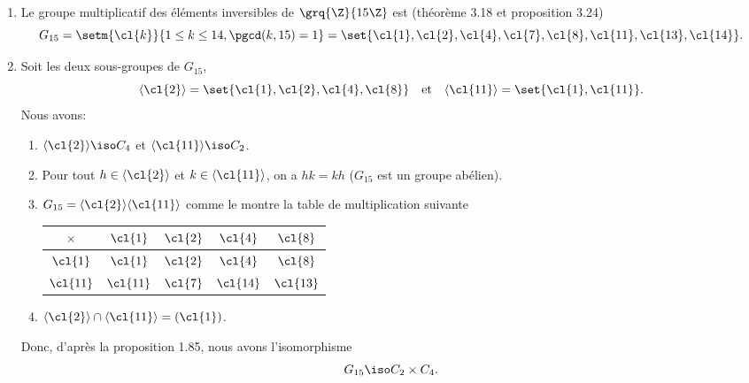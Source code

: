 \begin{enumerate}
  \item
    Le groupe multiplicatif des éléments inversibles de $\grq{\Z}{15\Z}$ est
    (théorème 3.18 et proposition 3.24)
    \[
      G_{15} 
        = \setm{\cl{k}}{1\leq k\leq 14, \pgcd(k,15)=1}
        = \set{
            \cl{1},\cl{2},\cl{4},\cl{7},\cl{8},\cl{11},\cl{13},\cl{14}
          }.
    \]
  \item
    Soit les deux sous-groupes de $G_{15}$,
    \[
      \langle\cl{2}\rangle = \set{\cl{1},\cl{2},\cl{4},\cl{8}}
      \quad\text{et}\quad
      \langle\cl{11}\rangle = \set{\cl{1},\cl{11}}.
    \]
    Nous avons:

    \begin{enumerate}[1)]
      \item
        $\langle\cl{2}\rangle \iso C_4$ et $\langle\cl{11}\rangle \iso C_2$.
      \item
        Pour tout $h\in\langle\cl{2}\rangle$ et $k\in\langle\cl{11}\rangle$, on
        a $hk = kh$ ($G_{15}$ est un groupe abélien).
      \item
        $G_{15} = \langle\cl{2}\rangle \langle\cl{11}\rangle$ comme le montre la
        table de multiplication suivante
        
        \begin{center}
          \begin{tabular}{c|cccc}
            $\times$  & $\cl{1}$  & $\cl{2}$ & $\cl{4}$  & $\cl{8}$ \\
            \midrule
            $\cl{1}$  & $\cl{1}$  & $\cl{2}$ & $\cl{4}$  & $\cl{8}$ \\
            $\cl{11}$ & $\cl{11}$ & $\cl{7}$ & $\cl{14}$ & $\cl{13}$
          \end{tabular}
        \end{center}

      \item
        $\langle\cl{2}\rangle \cap \langle\cl{11}\rangle = (\cl{1})$.
    \end{enumerate}
    
    Donc, d'après la proposition 1.85, nous avons l'isomorphisme
    \[
      G_{15} \iso C_2 \times C_4.
    \]
\end{enumerate}
